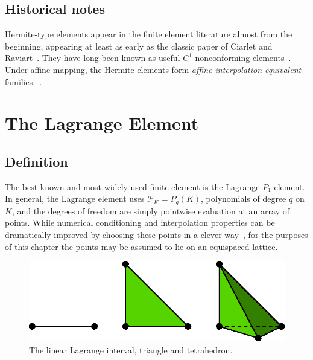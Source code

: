 \subsection{Historical notes}

Hermite-type elements appear in the finite element literature almost
from the beginning, appearing at least as early as the classic paper
of Ciarlet and Raviart~\cite{CiarletRaviart1972}. They have long been
known as useful \( C^1 \)-nonconforming
elements~\cite{Braess2007,Ciarlet2002}.  Under affine mapping, the
Hermite elements form
\emph{affine-interpolation equivalent} families.~\cite{BrennerScott2008}.

\newpage

\section{The Lagrange Element}

\subsection{Definition}

The best-known and most widely used finite element is the Lagrange
$P_1$ element. In general, the Lagrange element uses \( \mathcal{P}_K
= P_q(K) \), polynomials of degree $q$ on $K$, and the degrees of
freedom are simply pointwise evaluation at an array of points. While
numerical conditioning and interpolation properties can be
dramatically improved by choosing these points in a clever
way~\cite{missing}, for the purposes of this chapter the points may be
assumed to lie on an equispaced lattice.



\begin{figure}[H]
  \begin{center}
    \includegraphics[width=15cm]{chapters/kirby-6/eps/P1-1d2d3d.eps}
    \caption{The linear Lagrange interval, triangle and tetrahedron.}
  \end{center}
\end{figure}


